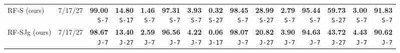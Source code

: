 \documentclass[10pt]{article}
\begin{document}
{\begin{tabular*}{\linewidth}{@{\extracolsep{\fill}}llrrrrrrrrrrrrr}
RF-S (ours) & 7/17/27 & \shortstack{\textbf{99.00}\\{\tiny\texttt{S-7}}} & \shortstack{\textbf{14.80}\\{\tiny\texttt{S-17}}} & \shortstack{\textbf{1.46}\\{\tiny\texttt{S-7}}} & \shortstack{\textbf{97.31}\\{\tiny\texttt{S-7}}} & \shortstack{\textbf{3.93}\\{\tiny\texttt{S-7}}} & \shortstack{\textbf{0.32}\\{\tiny\texttt{S-27}}} & \shortstack{\textbf{98.45}\\{\tiny\texttt{S-7}}} & \shortstack{\textbf{28.99}\\{\tiny\texttt{S-27}}} & \shortstack{\textbf{2.79}\\{\tiny\texttt{S-7}}} & \shortstack{\textbf{95.44}\\{\tiny\texttt{S-7}}} & \shortstack{\textbf{59.73}\\{\tiny\texttt{S-27}}} & \shortstack{\textbf{3.00}\\{\tiny\texttt{S-7}}} & \shortstack{\textbf{91.83}\\{\tiny\texttt{S-7}}}\\
RF-SJg (ours) & 7/17/27 & \shortstack{\textbf{98.67}\\{\tiny\texttt{J-7}}} & \shortstack{\textbf{13.40}\\{\tiny\texttt{J-27}}} & \shortstack{\textbf{2.59}\\{\tiny\texttt{J-7}}} & \shortstack{\textbf{96.56}\\{\tiny\texttt{J-7}}} & \shortstack{\textbf{4.22}\\{\tiny\texttt{J-7}}} & \shortstack{\textbf{0.06}\\{\tiny\texttt{J-17}}} & \shortstack{\textbf{98.07}\\{\tiny\texttt{J-7}}} & \shortstack{\textbf{20.82}\\{\tiny\texttt{J-27}}} & \shortstack{\textbf{3.90}\\{\tiny\texttt{J-7}}} & \shortstack{\textbf{94.63}\\{\tiny\texttt{J-7}}} & \shortstack{\textbf{43.72}\\{\tiny\texttt{J-27}}} & \shortstack{\textbf{4.43}\\{\tiny\texttt{J-7}}} & \shortstack{\textbf{90.62}\\{\tiny\texttt{J-7}}}\\

\end{tabular*}}
\end{document}
